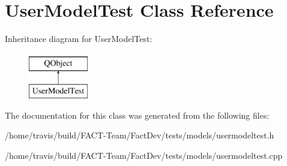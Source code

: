 \hypertarget{classUserModelTest}{\section{User\-Model\-Test Class Reference}
\label{classUserModelTest}
}
Inheritance diagram for User\-Model\-Test\-:\begin{figure}[H]
\begin{center}
\leavevmode
\includegraphics[height=2.000000cm]{de/d37/classUserModelTest}
\end{center}
\end{figure}


The documentation for this class was generated from the following files\-:\begin{DoxyCompactItemize}
\item 
/home/travis/build/\-F\-A\-C\-T-\/\-Team/\-Fact\-Dev/tests/models/usermodeltest.\-h\item 
/home/travis/build/\-F\-A\-C\-T-\/\-Team/\-Fact\-Dev/tests/models/usermodeltest.\-cpp\end{DoxyCompactItemize}
